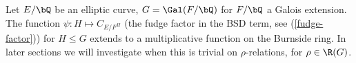 \begin{example}
Let $E / \bQ$ be an elliptic curve, $G = \Gal(F / \bQ)$ for $F / \bQ$ a Galois extension. The function $\psi \colon H \mapsto C_{E / F^H}$ (the fudge factor in the BSD term, see (\ref{fudge-factor})) for $H \leq G$ extends to a multiplicative function on the Burnside ring. In later sections we will investigate when this is trivial on $\rho$-relations, for $\rho \in \R(G)$. 
\end{example}



    
